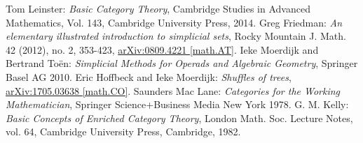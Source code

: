 \documentclass[11pt,a4paper,openright,oneside]{article}
\numberwithin{equation}{section}
\theoremstyle{definition}
\begin{document}







\newpage
\begin{thebibliography}{4}
     Tom Leinster: \textit{Basic Category Theory}, Cambridge Studies in Advanced Mathematics, Vol. 143, Cambridge University Press, 2014. 
     Greg Friedman: \textit{An elementary illustrated introduction to simplicial sets}, Rocky Mountain J. Math. 42 (2012), no. 2, 353-423, \href{https://arxiv.org/abs/0809.4221}{arXiv:0809.4221 [math.AT]}.
     Ieke Moerdijk and Bertrand To\"en: \textit{Simplicial Methods for Operads and Algebraic Geometry}, Springer Basel AG 2010.
     Eric Hoffbeck and Ieke Moerdijk: \textit{Shuffles of trees}, \href{https://arxiv.org/abs/1705.03638}{arXiv:1705.03638 [math.CO]}.
     Saunders Mac Lane: \textit{Categories for the Working Mathematician}, Springer Science+Business Media New York 1978.
     G. M. Kelly: \textit{Basic Concepts of Enriched Category Theory}, London Math. Soc. Lecture Notes, vol. 64, Cambridge University Press, Cambridge, 1982.
\end{thebibliography}
\end{document}
